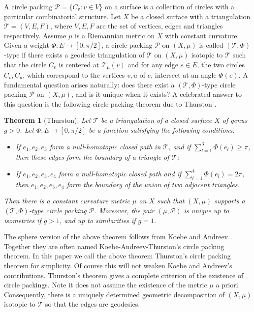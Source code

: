 \documentclass[12pt]{amsart}
\numberwithin{equation}{section}
\newtheorem{theo}[prop]{Theorem}
\begin{document}
A circle packing $\mathcal{P} = \{C_v : v \in V\}$ on a surface is a collection of circles with a particular combinatorial
structure. Let $X$ be a closed surface with a triangulation $\mathcal{T} = (V,E,F)$, where $V,E,F$ are the set
of vertices, edges and triangles respectively. Assume $\mu$ is a Riemannian metric on $X$ with constant
curvature. Given a weight $\Phi : E \to [0,\pi/2]$, a circle packing $\mathcal{P}$ on $(X,\mu)$ is called $(\mathcal{T},\Phi)$-type if there
exists a geodesic triangulation of $\mathcal{T}$ on $(X,\mu)$ isotopic to $\mathcal{T}$ such that the circle $C_v$ is centered at $\mathcal{T}_\mu(v)$
and for any edge $e \in E$, the two circles $C_v, C_u$, which correspond to the vertices $v,u$ of $e$, intersect at
an angle $\Phi(e)$. A fundamental question arises naturally: does there exist a $(\mathcal{T},\Phi)$-type circle packing $\mathcal{P}$
on $(X,\mu)$, and is it unique when it exists? A celebrated answer to this question is the following circle
packing theorem due to Thurston \cite[Chap.~13, Theorem~13.7.1]{Thurston}.

\begin{theo}[Thurston]\label{thm:Thurston}
Let $\mathcal{T}$ be a triangulation of a closed surface $X$ of genus $g > 0$. Let
$\Phi: E \to [0,\pi/2]$ be a function satisfying the following conditions:
\begin{itemize}
\item[($\mathrm{T}_1$).] If $e_1, e_2, e_3$ form a null-homotopic closed path in $\mathcal{T}$, and if $\sum_{l=1}^3 \Phi(e_l) \geq \pi$, then these edges form
the boundary of a triangle of $\mathcal{T}$;
\item[($\mathrm{T}_2$).] If $e_1, e_2, e_3, e_4$ form a null-homotopic closed path and if
$\sum_{l=1}^4 \Phi(e_l) = 2\pi$, then $e_1, e_2, e_3, e_4$ form the
boundary of the union of two adjacent triangles.
\end{itemize}
Then there is a constant curvature metric $\mu$ on $X$ such that $(X,\mu)$ supports a $(\mathcal{T},\Phi)$-type circle packing
$\mathcal{P}$. Moreover, the pair $(\mu,\mathcal{P})$ is unique up to isometries if $g > 1$, and up to similarities if $g = 1$.
\end{theo}

The sphere version of the above theorem follows from Koebe \cite{Koebe} and Andreev \cite{Andreev1,Andreev2}. Together they are
often named Koebe-Andreev-Thurston's circle packing theorem. In this paper we call the above theorem
Thurston's circle packing theorem for simplicity. Of course this will not weaken Koebe and Andreev's
contributions. Thurston's theorem gives a complete criterion of the existence of circle packings. Note
it does not assume the existence of the metric $\mu$ a priori. Consequently, there is a uniquely determined
geometric decomposition of $(X,\mu)$ isotopic to $\mathcal{T}$ so that the edges are geodesics.
\end{document}
